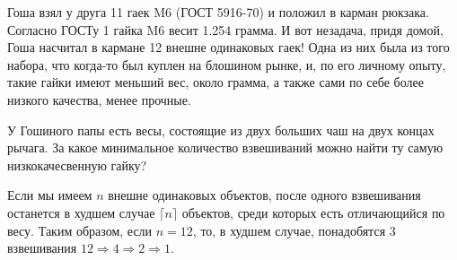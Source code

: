 Гоша взял у друга 11 гаек M6 (ГОСТ 5916-70) и положил в карман рюкзака. 
Согласно ГОСТу 1  гайка M6 весит 1.254 грамма. 
И вот незадача, придя домой, Гоша насчитал в кармане 12  внешне одинаковых гаек! 
Одна из них была из того набора, что когда-то был куплен на блошином рынке, и, по его личному опыту, 
такие гайки имеют меньший вес, около грамма, а также сами по себе более низкого качества, 
менее прочные. 

У Гошиного папы есть весы, состоящие из двух больших чаш на двух концах рычага. За какое минимальное количество взвешиваний можно найти ту самую низкокачесвенную гайку?

\soultionSection

Если мы имеем $n$ внешне одинаковых объектов, после одного взвешивания останется в худшем случае $\lceil n \rceil$ объектов, среди которых есть отличающийся по весу. Таким образом, если $n = 12$, то, в худшем случае, понадобятся 3 взвешивания $12\Rightarrow 4\Rightarrow 2\Rightarrow 1$.


